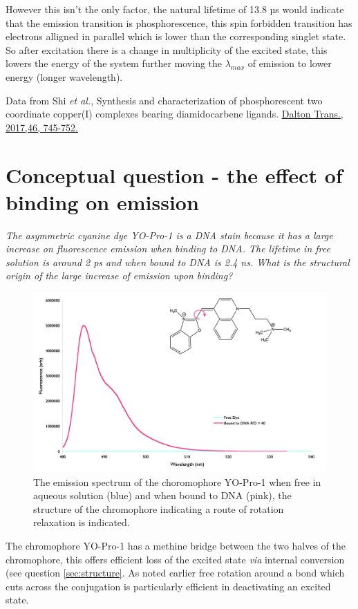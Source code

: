 \documentclass[
]{book}
\begin{document}
However this isn't the only factor, the natural lifetime of 13.8 µs would indicate that the emission transition is phosphorescence, this spin forbidden transition has electrons alligned in parallel which is lower than the corresponding singlet state. So after excitation there is a change in multiplicity of the excited state, this lowers the energy of the system further moving the \(\lambda _{max}\) of emission to lower energy (longer wavelength).

Data from Shi \emph{et al.}, Synthesis and characterization of phosphorescent two coordinate copper(I) complexes bearing diamidocarbene ligands. \href{https://doi.org/10.1039/C6DT04016K}{Dalton Trans., 2017,46, 745-752.}

\hypertarget{sec:binding}{%
\section{Conceptual question - the effect of binding on emission}\label{sec:binding}}

\emph{The asymmetric cyanine dye YO-Pro-1 is a DNA stain because it has a large increase on fluorescence emission when binding to DNA. The lifetime in free solution is around 2 ps and when bound to DNA is 2.4 ns. What is the structural origin of the large increase of emission upon binding?}

\begin{figure}

{\centering \includegraphics[width=0.7\linewidth]{images/YODNAans} 

}

\caption{The emission spectrum of the choromophore YO-Pro-1 when free in aqueous solution (blue) and when bound to DNA (pink), the structure of the chromophore indicating a route of rotation relaxation is indicated.}\label{fig:YODNA}
\end{figure}

The chromophore YO-Pro-1 has a methine bridge between the two halves of the chromophore, this offers efficient loss of the excited state \emph{via} internal conversion (see question \ref{sec:structure}. As noted earlier free rotation around a bond which cuts across the conjugation is particularly efficient in deactivating an excited state.
\end{document}
